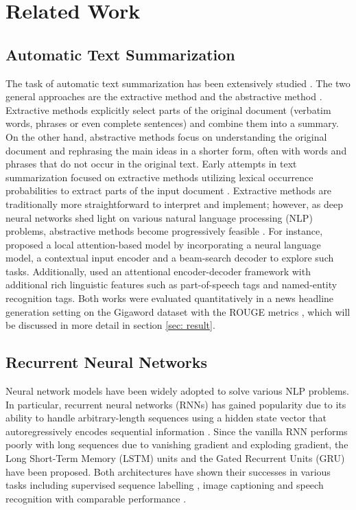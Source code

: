 \section{Related Work}
\label{sec: related_work}

\subsection{Automatic Text Summarization}

The task of automatic text summarization has been extensively studied \cite{gambhir2017recent}. The two general approaches are the extractive method and the abstractive method \cite{gupta2010survey}. Extractive methods explicitly select parts of the original document (verbatim words, phrases or even complete sentences) and combine them into a summary. On the other hand, abstractive methods focus on understanding the original document and rephrasing the main ideas in a shorter form, often with words and phrases that do not occur in the original text. Early attempts in text summarization focused on extractive methods utilizing lexical occurrence probabilities to extract parts of the input document \cite{mathis1973improvement}. Extractive methods are traditionally more straightforward to interpret and implement; however, as deep neural networks shed light on various natural language processing (NLP) problems, abstractive methods become progressively feasible \cite{nallapati2016sequence, nallapati2016abstractive, rush2015neural}. For instance, \cite{rush2015neural} proposed a local attention-based model by incorporating a neural language model, a contextual input encoder and a beam-search decoder to explore such tasks. Additionally, \cite{nallapati2016abstractive} used an attentional encoder-decoder framework with additional rich linguistic features such as part-of-speech tags and named-entity recognition tags. Both works were evaluated quantitatively in a news headline generation setting on the Gigaword dataset \cite{graff2003english} with the ROUGE metrics \cite{lin2004rouge}, which will be discussed in more detail in section \ref{sec: result}. 

\subsection{Recurrent Neural Networks}
Neural network models have been widely adopted to solve various NLP problems. In particular, recurrent neural networks (RNNs) has gained popularity due to its ability to handle arbitrary-length sequences using a hidden state vector that autoregressively encodes sequential information \cite{goodfellow2016}. Since the vanilla RNN performs poorly with long sequences due to vanishing gradient and exploding gradient, the Long Short-Term Memory (LSTM) units \cite{hochreiter1997long} and the Gated Recurrent Units (GRU) \cite{cho2014properties} have been proposed. Both architectures have shown their successes in various tasks including supervised sequence labelling \cite{graves2012supervised}, image captioning \cite{vinyals_2015} and speech recognition \cite{graves2013speech} with comparable performance \cite{yin2017comparative}.

